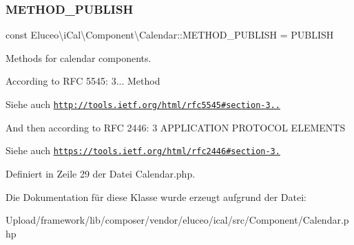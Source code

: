 \subsubsection{\texorpdfstring{M\+E\+T\+H\+O\+D\+\_\+\+P\+U\+B\+L\+I\+SH}{METHOD\_PUBLISH}}
{\footnotesize\ttfamily const Eluceo\textbackslash{}i\+Cal\textbackslash{}\+Component\textbackslash{}\+Calendar\+::\+M\+E\+T\+H\+O\+D\+\_\+\+P\+U\+B\+L\+I\+SH = \textquotesingle{}P\+U\+B\+L\+I\+SH\textquotesingle{}}

Methods for calendar components.

According to R\+FC 5545\+: 3... Method

\begin{DoxySeeAlso}{Siehe auch}
\href{http://tools.ietf.org/html/rfc5545#section-3.7.2}{\tt http\+://tools.\+ietf.\+org/html/rfc5545\#section-\/3..}
\end{DoxySeeAlso}
And then according to R\+FC 2446\+: 3 A\+P\+P\+L\+I\+C\+A\+T\+I\+ON P\+R\+O\+T\+O\+C\+OL E\+L\+E\+M\+E\+N\+TS \begin{DoxySeeAlso}{Siehe auch}
\href{https://tools.ietf.org/html/rfc2446#section-3.2}{\tt https\+://tools.\+ietf.\+org/html/rfc2446\#section-\/3.} 
\end{DoxySeeAlso}


Definiert in Zeile 29 der Datei Calendar.\+php.



Die Dokumentation für diese Klasse wurde erzeugt aufgrund der Datei\+:\begin{DoxyCompactItemize}
\item 
Upload/framework/lib/composer/vendor/eluceo/ical/src/\+Component/Calendar.\+php\end{DoxyCompactItemize}

